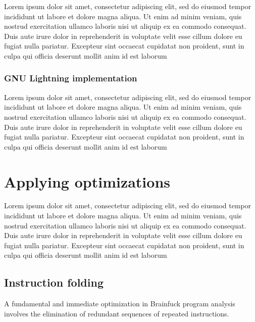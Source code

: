 \par Lorem ipsum dolor sit amet, consectetur adipiscing elit, sed do eiusmod tempor incididunt ut labore et dolore magna aliqua. Ut enim ad minim veniam, quis nostrud exercitation ullamco laboris nisi ut aliquip ex ea commodo consequat. Duis aute irure dolor in reprehenderit in voluptate velit esse cillum dolore eu fugiat nulla pariatur. Excepteur sint occaecat cupidatat non proident, sunt in culpa qui officia deserunt mollit anim id est laborum

\subsubsection{GNU Lightning implementation}
\label{sec:ch2sec2sub3sec2}

\par Lorem ipsum dolor sit amet, consectetur adipiscing elit, sed do eiusmod tempor incididunt ut labore et dolore magna aliqua. Ut enim ad minim veniam, quis nostrud exercitation ullamco laboris nisi ut aliquip ex ea commodo consequat. Duis aute irure dolor in reprehenderit in voluptate velit esse cillum dolore eu fugiat nulla pariatur. Excepteur sint occaecat cupidatat non proident, sunt in culpa qui officia deserunt mollit anim id est laborum

\section{Applying optimizations}
\label{sec:ch2sec3}

\par Lorem ipsum dolor sit amet, consectetur adipiscing elit, sed do eiusmod tempor incididunt ut labore et dolore magna aliqua. Ut enim ad minim veniam, quis nostrud exercitation ullamco laboris nisi ut aliquip ex ea commodo consequat. Duis aute irure dolor in reprehenderit in voluptate velit esse cillum dolore eu fugiat nulla pariatur. Excepteur sint occaecat cupidatat non proident, sunt in culpa qui officia deserunt mollit anim id est laborum

\subsection{Instruction folding}
\label{subsec:ch2sec3sec1}

\par A fundamental and immediate optimization in Brainfuck program analysis involves the elimination of redundant sequences of repeated instructions.

